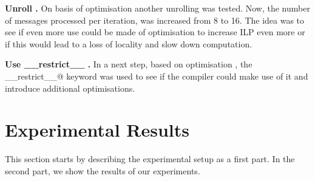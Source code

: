 \documentclass[letterpaper]{article}
\newcommand{\mypar}[1]{{\bf #1.}}
\begin{document}
\mypar{Unroll }
On basis of optimisation  another unrolling was tested. Now, the number of messages processed per iteration, was increased from 8 to 16. The idea was to see if even more use could be made of optimisation  to increase ILP even more or if this would lead to a loss of locality and slow down computation.


\mypar{Use \_\_restrict\_\_ }
In a next step, based on optimisation , the \verb@__restrict__@ keyword was used to see if the compiler could make use of it and introduce additional optimisations. 

%
%
%
%


\section{Experimental Results}\label{sec:exp}

This section starts by describing the experimental setup as a first part.
In the second part, we show the results of our experiments. 
\end{document}
